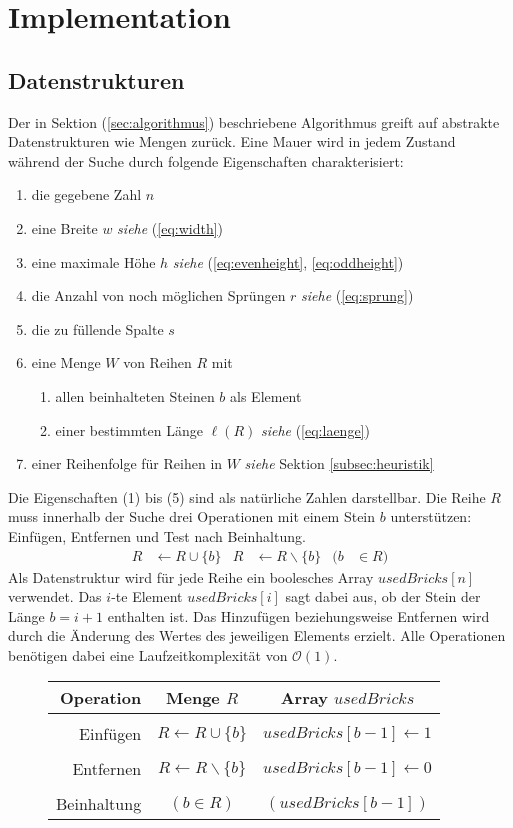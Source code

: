 \documentclass[a4paper, 12pt]{scrartcl}
\newcommand{\see}[1]{\hfill\emph{siehe} (\ref{#1})}
\begin{document}
\section{Implementation}
\subsection{Datenstrukturen}
\label{subsec:datenstrukturen}
Der in Sektion (\ref{sec:algorithmus}) beschriebene Algorithmus greift auf abstrakte Datenstrukturen wie Mengen zurück. Eine Mauer wird in jedem Zustand während der Suche durch folgende Eigenschaften charakterisiert:
\begin{enumerate}
	\itemsep-2pt
	\item die gegebene Zahl $n$
	\item eine Breite $w$ \see{eq:width}
	\item eine maximale Höhe $h$ \hfill \emph{siehe} (\ref{eq:evenheight}, \ref{eq:oddheight})
	\item die Anzahl von noch möglichen Sprüngen $r$ \see{eq:sprung}
	\item die zu füllende Spalte $s$
	\item eine Menge $W$ von Reihen $R$ mit
	\begin{enumerate}
		\item allen beinhalteten Steinen $b$ als Element
		\item einer bestimmten Länge $\ell(R)$ \see{eq:laenge}
	\end{enumerate}
	\item einer Reihenfolge für Reihen in $W$  \hfill \emph{siehe} Sektion \ref{subsec:heuristik}
\end{enumerate}
Die Eigenschaften (1) bis (5) sind als natürliche Zahlen darstellbar. Die Reihe $R$ muss innerhalb der Suche drei Operationen mit einem Stein $b$ unterstützen: Einfügen, Entfernen und Test nach Beinhaltung.
\begin{align*}
 	R &\leftarrow R\cup\{b\} & R &\leftarrow R\backslash\{b\} & (b &\in R)
\end{align*}
Als Datenstruktur wird für jede Reihe ein boolesches Array $usedBricks[n]$ verwendet. Das $i$-te Element $usedBricks[i]$ sagt dabei aus, ob der Stein der Länge $b=i+1$ enthalten ist. Das Hinzufügen beziehungsweise Entfernen wird durch die Änderung des Wertes des jeweiligen Elements erzielt. Alle Operationen benötigen dabei eine Laufzeitkomplexität von $\mathcal{O}(1)$.
\begin{figure}[H]
	\centering
	\begin{tabular}{rcc}
		Operation & \hspace{1cm} Menge $R$ \hspace{1cm} & Array $usedBricks$ \\
		\hline\\
		Einfügen & $R \leftarrow R\cup\{b\}$ & $usedBricks[b-1] \leftarrow 1$ \\\\
		Entfernen & $R \leftarrow R\backslash\{b\}$ & $usedBricks[b-1] \leftarrow 0$ \\\\
		Beinhaltung & $(b \in R)$ & $(usedBricks[b-1])$
	\end{tabular}
\end{figure}
\end{document}
